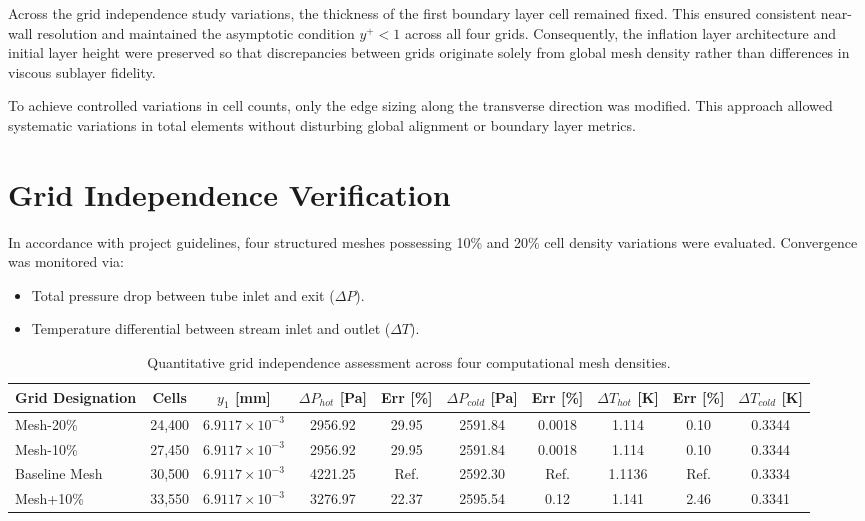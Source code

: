 \documentclass[12pt,a4paper]{report}
\begin{document}
Across the grid independence study variations, the thickness of the first boundary layer cell remained fixed. This ensured consistent near-wall resolution and maintained the asymptotic condition $y^+ < 1$ across all four grids. Consequently, the inflation layer architecture and initial layer height were preserved so that discrepancies between grids originate solely from global mesh density rather than differences in viscous sublayer fidelity.

To achieve controlled variations in cell counts, only the edge sizing along the transverse direction was modified. This approach allowed systematic variations in total elements without disturbing global alignment or boundary layer metrics.

\section{Grid Independence Verification}
In accordance with project guidelines, four structured meshes possessing 10\% and 20\% cell density variations were evaluated. Convergence was monitored via:
\begin{itemize}
    \item Total pressure drop between tube inlet and exit ($\Delta P$).
    \item Temperature differential between stream inlet and outlet ($\Delta T$).
\end{itemize}

\begin{table}[H]
\centering
\small
\caption{Quantitative grid independence assessment across four computational mesh densities.}
\label{tab:grid_independence}
\begin{tabular}{lccccccccc}
\toprule
\textbf{Grid Designation} & \textbf{Cells} & \textbf{$y_1$ [mm]} & \textbf{$\Delta P_{hot}$ [Pa]} & \textbf{Err [\%]} & \textbf{$\Delta P_{cold}$ [Pa]} & \textbf{Err [\%]} & \textbf{$\Delta T_{hot}$ [K]} & \textbf{Err [\%]} & \textbf{$\Delta T_{cold}$ [K]} \\
\midrule
Mesh-20\% & 24,400 & $6.9117\times 10^{-3}$ & 2956.92 & 29.95 & 2591.84 & 0.0018 & 1.114 & 0.10 & 0.3344 \\
Mesh-10\% & 27,450 & $6.9117\times 10^{-3}$ & 2956.92 & 29.95 & 2591.84 & 0.0018 & 1.114 & 0.10 & 0.3344 \\
Baseline Mesh & 30,500 & $6.9117\times 10^{-3}$ & 4221.25 & Ref. & 2592.30 & Ref. & 1.1136 & Ref. & 0.3334 \\
Mesh+10\% & 33,550 & $6.9117\times 10^{-3}$ & 3276.97 & 22.37 & 2595.54 & 0.12 & 1.141 & 2.46 & 0.3341 \\
\bottomrule
\end{tabular}
\end{table}
\end{document}

